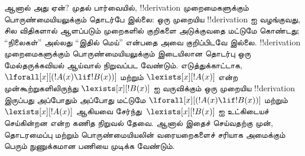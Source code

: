 \documentclass[../../../include/open-logic-section]{subfiles}
\begin{document}
ஆனால் அது ஏன்? முதல் பார்வையில், !!{derivation} முறைமைகளுக்கும்
பொருண்மையியலுக்கும் தொடர்பே இல்லை: ஒரு முறையிய !!{derivation} ஐ வழங்குவது,
சில விதிகளால் ஆளப்படும் முறைகளில் குறிகளை அடுக்குவதை மட்டுமே கொண்டது;
``நிலைகள்'' அல்லது ``இதில் மெய்'' என்பதை அவை குறிப்பிடவே இல்லை.
!!{derivation} முறைமைகளுக்கும் பொருண்மையியலுக்கும் இடையிலான தொடர்பு ஒரு
மேல்தருக்கவியல் ஆய்வால் நிறுவப்பட வேண்டும். எடுத்துக்காட்டாக,
$\lforall[x][(!A(x) \lif !B(x))]$ மற்றும் $\lexists[x][!A(x)]$ என்ற
முன்கூற்றுகளிலிருந்து $\lexists[x][!B(x)]$ ஐ வருவிக்கும் ஒரு முறையிய
!!{derivation} இருப்பது அப்போதும் அப்போது மட்டுமே
$\lforall[x][(!A(x) \lif !B(x))]$ மற்றும் $\lexists[x][!A(x)]$ ஆகியவை
சேர்ந்து~$\lexists[x][!B(x)]$ ஐ உட்கிடையச் செய்கின்றன என்ற கணித நிறுவல்
தேவை. ஆனால் இதைச் செய்வதற்கு முன், தொடரமைப்பு மற்றும் பொருண்மையியலின்
வரையறைகளைச் சரியாக அமைக்கும் பெரும் நுணுக்கமான பணியை முடிக்க வேண்டும்.
\end{document}
